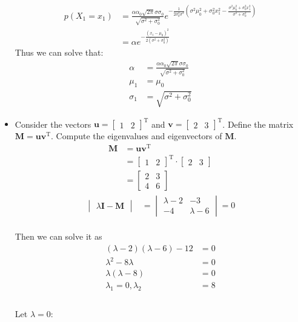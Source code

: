 \documentclass{article}
\begin{document}
\begin{itemize}
\begin{align*}
\end{align*}\\
\begin{align*}
    p(X_{1} = x_{1}) &= \frac{\alpha\alpha_{0}\sqrt{2\pi}\sigma\sigma_{0}}{\sqrt{\sigma^2 + \sigma_{0}^2}} e ^ {-\frac{1}{2\sigma_{0}^2\sigma^2}(\sigma^2\mu_{0}^2 + \sigma_{0}^2x_{1}^2 - \frac{\sigma^2\mu_{0}^2 + \sigma_{0}^2x_{1}^2}{\sigma^2 + \sigma_{0}^2})}\\
    &= \alpha e^{-\frac{(x_{1} - \mu_{0})^2}{2(\sigma^2 + \sigma_{0}^2)}}
\end{align*}
Thus we can solve that:\\
\begin{align*}
    \alpha &= \frac{\alpha\alpha_{0}\sqrt{2\pi}\sigma\sigma_{0}}{\sqrt{\sigma^2 + \sigma_{0}^2}}\\
    \mu_{1} &= \mu_{0}\\
    \sigma_{1} &= \sqrt{\sigma^2 + \sigma_{0}^2}
\end{align*}
\item Consider the vectors $\bm{u} = \begin{bmatrix}
	1&2
\end{bmatrix}^\mathrm{T}$ and $\bm{v} = \begin{bmatrix}
	2&3
\end{bmatrix}^\mathrm{T}$. Define the matrix $\bm{M} = \bm{u}\bm{v}^\mathrm{T}$. Compute the eigenvalues and eigenvectors of $\bm{M}$.\\
\begin{align*}
	\bm{M} &= \bm{u}\bm{v}^\mathrm{T}\\
	&= \begin{bmatrix}1&2\end{bmatrix}^\mathrm{T}\cdot\begin{bmatrix}2&3\end{bmatrix}\\
&= \begin{bmatrix}2&3\\4&6\end{bmatrix}
\end{align*}
\begin{align*}
	\begin{vmatrix}\lambda \bm{I} - \bm{M}
		\end{vmatrix}
	&= 
	\begin{vmatrix}
		\lambda - 2 & -3\\
		-4 & \lambda - 6
	\end{vmatrix} = 0
\end{align*}\\
Then we can solve it as\\
\begin{align*}
	(\lambda - 2)(\lambda - 6) - 12 &= 0\\
	\lambda ^2 - 8 \lambda &= 0\\
	\lambda(\lambda - 8) &= 0\\
	\lambda_{1} = 0, \lambda_{2} &= 8\\
\end{align*}\\
Let $\lambda = 0$:\\


\end{itemize}
\end{document}
